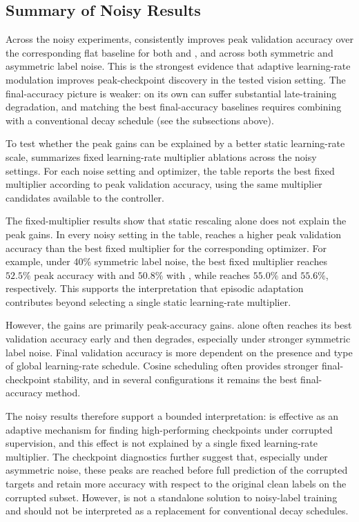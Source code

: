 \FloatBarrier
\subsection{Summary of Noisy \cifar{} Results}

Across the noisy \cifar{} experiments, \method{} consistently improves peak validation
accuracy over the corresponding flat baseline for both \adamw{} and \sgdm{}, and across
both symmetric and asymmetric label noise. This is the strongest evidence that adaptive
learning-rate modulation improves peak-checkpoint discovery in the tested vision
setting. The final-accuracy picture is weaker: \method{} on its own can suffer
substantial late-training degradation, and matching the best final-accuracy baselines
requires combining \method{} with a conventional decay schedule (see the subsections
above).

To test whether the peak gains can be explained by a better static learning-rate scale,
 summarizes fixed learning-rate
multiplier ablations across the noisy \cifar{} settings. For each noise setting and
optimizer, the table reports the best fixed multiplier according to peak validation
accuracy, using the same multiplier candidates available to the \method{} controller.



The fixed-multiplier results show that static rescaling alone does not explain the
\method{} peak gains. In every noisy setting in the table, \method{} reaches a higher
peak validation accuracy than the best fixed multiplier for the corresponding optimizer.
For example, under 40\% symmetric label noise, the best fixed multiplier reaches
$52.5\%$ peak accuracy with \adamw{} and $50.8\%$ with \sgdm{}, while \method{}
reaches $55.0\%$ and $55.6\%$, respectively. This supports the interpretation that
episodic adaptation contributes beyond selecting a single static learning-rate multiplier.

However, the gains are primarily peak-accuracy gains. \method{} alone often reaches its
best validation accuracy early and then degrades, especially under stronger symmetric
label noise. Final validation accuracy is more dependent on the presence and type of
global learning-rate schedule. Cosine scheduling often provides stronger final-checkpoint
stability, and in several \sgdm{} configurations it remains the best final-accuracy method.

The noisy \cifar{} results therefore support a bounded interpretation: \method{} is
effective as an adaptive mechanism for finding high-performing checkpoints under
corrupted supervision, and this effect is not explained by a single fixed learning-rate
multiplier. The checkpoint diagnostics further suggest that, especially under asymmetric
noise, these peaks are reached before full prediction of the corrupted targets and retain
more accuracy with respect to the original clean labels on the corrupted subset.
However, \method{} is not a standalone solution to noisy-label training and should not
be interpreted as a replacement for conventional decay schedules.